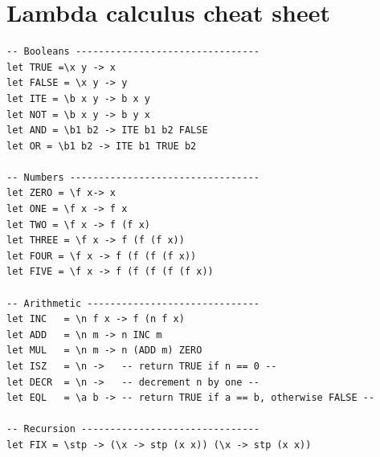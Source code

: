 \documentclass[paper=letter, fontsize=13pt]{article} %
\numberwithin{equation}{section} %
\begin{document}
\newpage
\[ \]
\newpage
\section{Lambda calculus cheat sheet}
\begin{lstlisting}
-- Booleans --------------------------------
let TRUE =\x y -> x
let FALSE = \x y -> y
let ITE = \b x y -> b x y
let NOT = \b x y -> b y x
let AND = \b1 b2 -> ITE b1 b2 FALSE 
let OR = \b1 b2 -> ITE b1 TRUE b2

-- Numbers ---------------------------------
let ZERO = \f x-> x
let ONE = \f x -> f x 
let TWO = \f x -> f (f x) 
let THREE = \f x -> f (f (f x))
let FOUR = \f x -> f (f (f (f x))
let FIVE = \f x -> f (f (f (f (f x))

-- Arithmetic ------------------------------
let INC   = \n f x -> f (n f x)
let ADD   = \n m -> n INC m 
let MUL   = \n m -> n (ADD m) ZERO
let ISZ   = \n ->   -- return TRUE if n == 0 --
let DECR  = \n ->   -- decrement n by one --  
let EQL   = \a b -> -- return TRUE if a == b, otherwise FALSE --

-- Recursion -------------------------------
let FIX = \stp -> (\x -> stp (x x)) (\x -> stp (x x))
\end{lstlisting}
\end{document}
